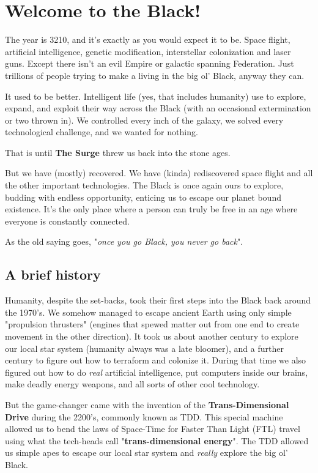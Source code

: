 \section{Welcome to the Black!}

\begin{multicols}{2}
  The year is 3210, and it's exactly as you would expect it to be. Space flight, artificial intelligence, genetic modification, interstellar colonization and laser guns. Except there isn't an evil Empire or galactic spanning Federation. Just trillions of people trying to make a living in the big ol' Black, anyway they can.
  
  It used to be better. Intelligent life (yes, that includes humanity) use to explore, expand, and exploit their way across the Black (with an occasional extermination or two thrown in). We controlled every inch of the galaxy, we solved every technological challenge, and we wanted for nothing.
  
  That is until \textbf{The Surge} threw us back into the stone ages.

  But we have (mostly) recovered. We have (kinda) rediscovered space flight and all the other important technologies. The Black is once again ours to explore, budding with endless opportunity, enticing us to escape our planet bound existence. It's the only place where a person can truly be free in an age where everyone is constantly connected.
  
  As the old saying goes, "\textit{once you go Black, you never go back}".
  
  \subsection{A brief history}

  Humanity, despite the set-backs, took their first steps into the Black back around the 1970's. We somehow managed to escape ancient Earth using only simple "propulsion thrusters" (engines that spewed matter out from one end to create movement in the other direction). It took us about another century to explore our local star system (humanity always was a late bloomer), and a further century to figure out how to terraform and colonize it. During that time we also figured out how to do \textit{real} artificial intelligence, put computers inside our brains, make deadly energy weapons, and all sorts of other cool technology.

  But the game-changer came with the invention of the \textbf{Trans-Dimensional Drive} during the 2200's, commonly known as TDD. This special machine allowed us to bend the laws of Space-Time for Faster Than Light (FTL) travel using what the tech-heads call "\textbf{trans-dimensional energy}". The TDD allowed us simple apes to escape our local star system and \textit{really} explore the big ol' Black.


\end{multicols}

